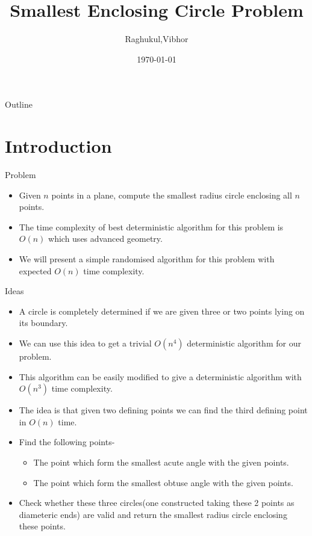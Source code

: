 \documentclass{beamer}
\title[CS648]{Smallest Enclosing Circle Problem}
\author{Raghukul,Vibhor}
\institute{IIT Kanpur}
\date{\today}
\begin{document}
\begin{frame}
  \titlepage
\end{frame}

\begin{frame}{Outline}
  \tableofcontents
\end{frame}

\section{Introduction}

\begin{frame}{Problem}
  \begin{itemize}
      \item Given $n$ points in a plane, compute the smallest radius circle enclosing all $n$ points.
      \pause
      \item The time complexity of best deterministic algorithm for this problem is $O(n)$ which uses advanced geometry.
      \pause 
      \item We will present a simple randomised algorithm for this problem with expected $O(n)$ time complexity. 
      \pause
    \end{itemize}
\end{frame}

\begin{frame}{Ideas}
  \begin{itemize}
      \item A circle is completely determined if we are given three or two points lying on its boundary.
      \pause
      \item We can use this idea to get a trivial $O(n^4)$ deterministic algorithm for our problem.
      \pause
      \item This algorithm can be easily modified to give a deterministic algorithm with $O(n^3)$ time complexity.
      \pause
      \item The idea is that given two defining points we can find the third defining point in $O(n)$ time.
      \pause
      \item Find the following points-
      \begin{itemize}
          \item The point which form the smallest acute angle with the given points.
          \item The point which form the smallest obtuse angle with the given points.
      \end{itemize}
      \pause
      \item Check whether these three circles(one constructed taking these 2 points as diameteric ends) are valid and return the smallest radius circle enclosing these points.
  \end{itemize}
\end{frame}
\end{document}
